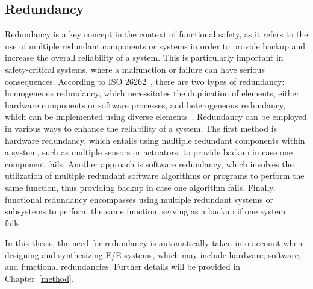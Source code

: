      
    \subsection{Redundancy}
    
    Redundancy is a key concept in the context of functional safety, as it refers to the use of multiple redundant components or systems in order to provide backup and increase the overall reliability of a system. This is particularly important in safety-critical systems, where a malfunction or failure can have serious consequences.
    According to ISO 26262~\cite{iso26262}, there are two types of redundancy: homogeneous redundancy, which necessitates the duplication of elements, either hardware components or software processes, and heterogeneous redundancy, which can be implemented using diverse elements~\cite{askaripoor2023designer, 9565115}.
   Redundancy can be employed in various ways to enhance the reliability of a system. The first method is hardware redundancy, which entails using multiple redundant components within a system, such as multiple sensors or actuators, to provide backup in case one component fails. Another approach is software redundancy, which involves the utilization of multiple redundant software algorithms or programs to perform the same function, thus providing backup in case one algorithm fails. Finally, functional redundancy encompasses using multiple redundant systems or subsystems to perform the same function, serving as a backup if one system fails~\cite{iso26262, 9565115, 9212001}.
   
   
   In this thesis, the need for redundancy is automatically taken into account when designing and synthesizing E/E systems, which may include hardware, software, and functional redundancies. Further details will be provided in Chapter~\ref{method}.
   
    
